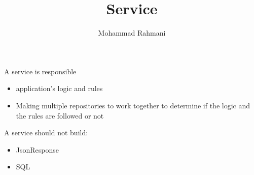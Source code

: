 \documentclass[a4paper]{article}
\title{Service}
\date{}
\author{Mohammad Rahmani}
\begin{document}
    \maketitle
    A service is responsible
    \begin{itemize}
        \item application's logic and rules
        \item Making multiple repositories to work together to determine if the logic and the rules are followed or not
    \end{itemize}
    A service should not build:
    \begin{itemize}
        \item JsonResponse
        \item SQL
    \end{itemize}
    
    
\end{document}
